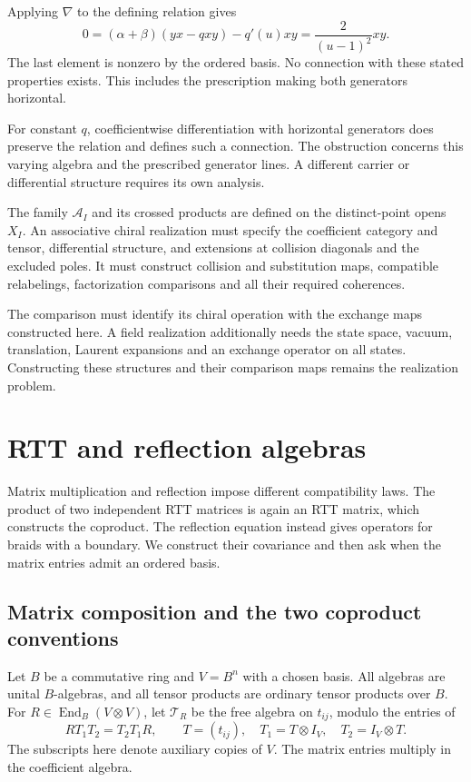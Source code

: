 Applying $\nabla$ to the defining relation gives
\[
 0=(\alpha+\beta)(yx-qxy)-q'(u)xy
   =\frac{2}{(u-1)^2}xy.
\]
The last element is nonzero by the ordered basis.  No connection with
these stated properties exists.  This includes the prescription making
both generators horizontal.

For constant $q$, coefficientwise differentiation with horizontal
generators does preserve the relation and defines such a connection.
The obstruction concerns this varying algebra and the prescribed generator
lines.  A different carrier or differential structure requires its own analysis.

The family $\mathcal A_I$ and its crossed products are defined on the
distinct-point opens $X_I$.  An associative chiral realization must specify
the coefficient category and tensor, differential structure, and extensions
at collision diagonals and the excluded poles.  It must construct
collision and substitution maps, compatible relabelings, factorization
comparisons and all their required coherences.

The comparison must identify its chiral operation with the exchange maps
constructed here.  A field realization additionally needs the state space,
vacuum, translation, Laurent expansions and an exchange operator on all
states.  Constructing these structures and their comparison maps remains
the realization problem.

\chapter{RTT and reflection algebras}\label{cbc:reflection:chapter}
Matrix multiplication and reflection impose different compatibility laws.
The product of two independent RTT matrices is again an RTT matrix, which
constructs the coproduct.  The reflection equation instead gives operators
for braids with a boundary.  We construct their covariance and then ask
when the matrix entries admit an ordered basis.

\section{Matrix composition and the two coproduct conventions}
Let $B$ be a commutative ring and $V=B^n$ with a chosen basis.
All algebras are unital $B$-algebras, and all tensor products are ordinary
tensor products over $B$.
For $R\in\operatorname{End}_B(V\otimes V)$, let
$\mathcal T_R$ be the free algebra on $t_{ij}$, modulo the entries of
\begin{equation}\label{cbc:reflection:constant-rtt}
 R T_1T_2=T_2T_1R,\qquad T=(t_{ij}),\quad
 T_1=T\otimes I_V,\quad T_2=I_V\otimes T.
\end{equation}
The subscripts here denote auxiliary copies of $V$.
The matrix entries multiply in the coefficient algebra.

